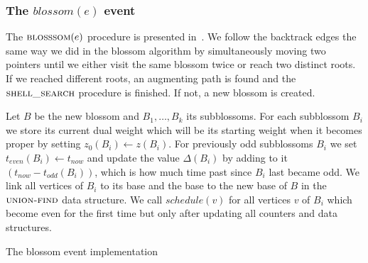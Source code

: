 \subsubsection*{The $blossom(e)$ event}
The $\textsc{blosssom}(e)$ procedure is presented in~. We follow the backtrack edges the same way we did in the blossom algorithm by simultaneously moving two pointers until we either visit the same blossom twice or reach two distinct roots. If we reached different roots, an augmenting path is found and the $\textsc{shell\_search}$ procedure is finished. If not, a new blossom is created. 

Let $B$ be the new blossom and $B_1, \dots, B_k$ its subblossoms. For each subblossom $B_i$ we store its current dual weight which will be its starting weight when it becomes proper by setting $z_0(B_i) \gets z(B_i)$. For previously odd subblossoms $B_i$ we set $t_{even}(B_i) \gets t_{now}$ and update the value $\Delta(B_i)$ by adding to it $(t_{now} - t_{odd}(B_i))$, which is how much time past since $B_i$ last became odd. We link all vertices of $B_i$ to its base and the base to the new base of $B$ in the $\textsc{union-find}$ data structure. We call $schedule(v)$ for all vertices $v$ of $B_i$ which become even for the first time but only after updating all counters and data structures.

\begin{algorithm}
\caption{The blossom event implementation}\label{alg:blossom}
\begin{algorithmic}[1]
    \EndIf
            \EndFor
        \EndIf
    \EndFor
    \EndFor
\EndProcedure
\end{algorithmic}
\end{algorithm}

